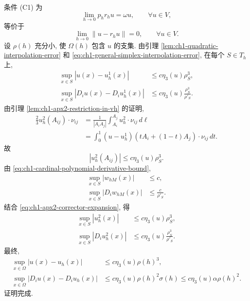 \begin{Proof}
条件 (C1) 为
\begin{equation}
\lim_{h\to0}p_hr_hu=\omega u,\qquad\forall u\in V,
\label{eq:ch1-apx2-condition-c1}
\end{equation}
等价于
\begin{equation}
\lim_{h\to0}\|u-r_hu\|=0,\qquad\forall u\in V.
\label{eq:ch1-apx2-restriction-convergence}
\end{equation}
设 $\rho(h)$ 充分小, 使 $\Omega(h)$ 包含 $u$ 的支集. 由引理 \ref{lem:ch1-quadratic-interpolation-error} 和 \eqref{eq:ch1-general-simplex-interpolation-error}, 在每个 $S\in T_h$ 上,
\begin{equation}
\begin{aligned}
\sup_{x\in S}|u(x)-u_h^1(x)|&\leq c\eta_3(u)\rho_S^3,\\
\sup_{x\in S}|D_iu(x)-D_iu_h^1(x)|
&\leq c\eta_3(u)\frac{\rho_S^3}{\rho'_S}.
\end{aligned}
\label{eq:ch1-apx2-primary-error}
\end{equation}
由引理 \ref{lem:ch1-apx2-restriction-in-vh} 的证明,
\begin{equation}
\begin{aligned}
\frac23u_h^2(A_{ij})\cdot\nu_{ij}
&=\frac1{|A_iA_j|}\int_{A_i}^{A_j}u_h^2\cdot\nu_{ij}\,d\ell\\
&=\int_0^1(u-u_h^1)(tA_i+(1-t)A_j)\cdot\nu_{ij}\,dt.
\end{aligned}
\label{eq:ch1-apx2-corrector-edge-average}
\end{equation}
故
\begin{equation}
|u_h^2(A_{ij})|
\leq c\eta_3(u)\rho_S^3.
\label{eq:ch1-apx2-corrector-node-bound}
\end{equation}
由 \eqref{eq:ch1-cardinal-polynomial-derivative-bound},
\begin{equation}
\begin{aligned}
\sup_{x\in S}|w_{hM}(x)|&\leq c,\\
\sup_{x\in S}|D_iw_{hM}(x)|&\leq\frac c{\rho'_S}.
\end{aligned}
\label{eq:ch1-apx2-basis-bounds}
\end{equation}
结合 \eqref{eq:ch1-apx2-corrector-expansion}, 得
\begin{equation}
\begin{aligned}
\sup_{x\in S}|u_h^2(x)|&\leq c\eta_3(u)\rho_S^3,\\
\sup_{x\in S}|D_iu_h^2(x)|
&\leq c\eta_3(u)\frac{\rho_S^3}{\rho'_S}.
\end{aligned}
\label{eq:ch1-apx2-corrector-bounds}
\end{equation}
最终,
\begin{equation}
\begin{aligned}
\sup_{x\in\Omega}|u(x)-u_h(x)|
&\leq c\eta_3(u)\rho(h)^3,\\
\sup_{x\in\Omega}|D_iu(x)-D_iu_h(x)|
&\leq c\eta_3(u)\rho(h)^2\sigma(h)
\leq c\eta_3(u)\alpha\rho(h)^2.
\end{aligned}
\label{eq:ch1-apx2-global-bounds}
\end{equation}
证明完成.
\end{Proof}

